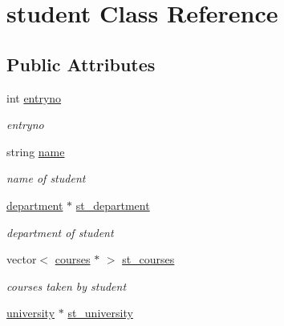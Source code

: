 \hypertarget{classstudent}{\section{student \-Class \-Reference}
\label{classstudent}
}
\subsection*{\-Public \-Attributes}
\begin{DoxyCompactItemize}
\item 
\hypertarget{classstudent_afc8aaef763625548919523b41144aee2}{int \hyperlink{classstudent_afc8aaef763625548919523b41144aee2}{entryno}}\label{classstudent_afc8aaef763625548919523b41144aee2}

\begin{DoxyCompactList}\small\item\em entryno \end{DoxyCompactList}\item 
\hypertarget{classstudent_a122049139d2318a619cfcfed816f8575}{string \hyperlink{classstudent_a122049139d2318a619cfcfed816f8575}{name}}\label{classstudent_a122049139d2318a619cfcfed816f8575}

\begin{DoxyCompactList}\small\item\em name of student \end{DoxyCompactList}\item 
\hypertarget{classstudent_ae8c6ccc174c06c8ad37ceab4d192d4a2}{\hyperlink{classdepartment}{department} $\ast$ \hyperlink{classstudent_ae8c6ccc174c06c8ad37ceab4d192d4a2}{st\-\_\-department}}\label{classstudent_ae8c6ccc174c06c8ad37ceab4d192d4a2}

\begin{DoxyCompactList}\small\item\em department of student \end{DoxyCompactList}\item 
\hypertarget{classstudent_a793eb7ff09bb7b7a5b0698bfab747e5a}{vector$<$ \hyperlink{classcourses}{courses} $\ast$ $>$ \hyperlink{classstudent_a793eb7ff09bb7b7a5b0698bfab747e5a}{st\-\_\-courses}}\label{classstudent_a793eb7ff09bb7b7a5b0698bfab747e5a}

\begin{DoxyCompactList}\small\item\em courses taken by student \end{DoxyCompactList}\item 
\hypertarget{classstudent_aaa53e8cfb969e5900d3efe1f034d028a}{\hyperlink{classuniversity}{university} $\ast$ \hyperlink{classstudent_aaa53e8cfb969e5900d3efe1f034d028a}{st\-\_\-university}}\label{classstudent_aaa53e8cfb969e5900d3efe1f034d028a}


\end{DoxyCompactItemize}
